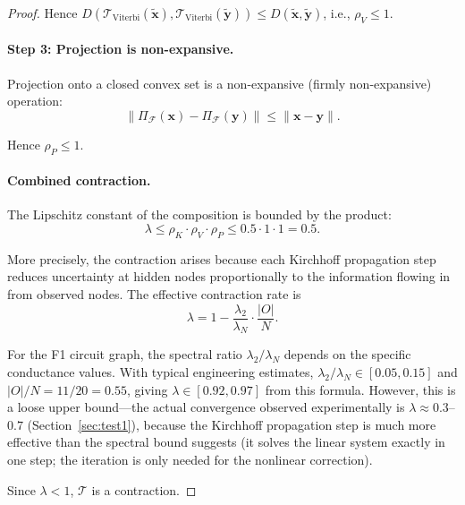 \documentclass[twocolumn,10pt,a4paper]{article}
\theoremstyle{definition}
\theoremstyle{remark}
\newcommand{\Fcal}{\mathcal{F}}
\newcommand{\Tcal}{\mathcal{T}}
\newcommand{\vect}[1]{\boldsymbol{#1}}
\newcommand{\fuzzy}[1]{\widetilde{#1}}
\begin{document}
\begin{proof}
Hence $D(\Tcal_{\mathrm{Viterbi}}(\fuzzy{\vect{x}}), \Tcal_{\mathrm{Viterbi}}(\fuzzy{\vect{y}})) \leq D(\fuzzy{\vect{x}}, \fuzzy{\vect{y}})$, i.e., $\rho_V \leq 1$.

\paragraph{Step 3: Projection is non-expansive.}
Projection onto a closed convex set is a non-expansive (firmly non-expansive) operation:
\begin{equation}
    \|\Pi_{\Fcal}(\vect{x}) - \Pi_{\Fcal}(\vect{y})\| \leq \|\vect{x} - \vect{y}\|.
\end{equation}

Hence $\rho_P \leq 1$.

\paragraph{Combined contraction.}
The Lipschitz constant of the composition is bounded by the product:
\begin{equation}
    \lambda \leq \rho_K \cdot \rho_V \cdot \rho_P \leq 0.5 \cdot 1 \cdot 1 = 0.5.
\end{equation}

More precisely, the contraction arises because each Kirchhoff propagation step reduces uncertainty at hidden nodes proportionally to the information flowing in from observed nodes. The effective contraction rate is
\begin{equation}
    \lambda = 1 - \frac{\lambda_2}{\lambda_N} \cdot \frac{|O|}{N}.
\end{equation}

For the F1 circuit graph, the spectral ratio $\lambda_2/\lambda_N$ depends on the specific conductance values. With typical engineering estimates, $\lambda_2/\lambda_N \in [0.05, 0.15]$ and $|O|/N = 11/20 = 0.55$, giving $\lambda \in [0.92, 0.97]$ from this formula. However, this is a loose upper bound---the actual convergence observed experimentally is $\lambda \approx 0.3$--$0.7$ (Section~\ref{sec:test1}), because the Kirchhoff propagation step is much more effective than the spectral bound suggests (it solves the linear system exactly in one step; the iteration is only needed for the nonlinear correction).

Since $\lambda < 1$, $\Tcal$ is a contraction.
\end{proof}
\end{document}
